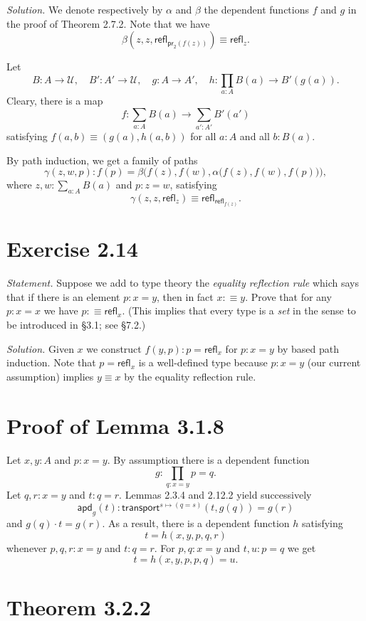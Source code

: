 \documentclass[12pt]{article}
\newcommand{\msf}{\mathsf}
\newcommand{\nn}{\noindent}
\newcommand{\pr}{\mathsf{pr}}
\newcommand{\refl}{\mathsf{refl}}
\newcommand{\U}{\mathcal U}
\begin{document}
\nn\emph{Solution.} We denote respectively by $\alpha$ and $\beta$ the dependent functions $f$ and $g$ in the proof of Theorem 2.7.2. Note that we have 
$$
\beta(z,z,\refl_{\pr_2(f(z))})\equiv\refl_z.
$$

Let 
$$
B:A\to\U,\quad B':A'\to\U,\quad g:A\to A',\quad h:\prod_{a:A}B(a)\to B'(g(a)).
$$ 
Cleary, there is a map 
$$
f:\sum_{a:A}B(a)\to\sum_{a':A'}B'(a')
$$ 
satisfying $f(a,b)\equiv (g(a),h(a,b))$ for all $a:A$ and all $b:B(a)$. 

By path induction, we get a family of paths 
$$
\gamma(z,w,p):f(p)=\beta\Big(f(z),f(w),\alpha\big(f(z),f(w),f(p)\big)\Big),
$$ 
where $z,w:\sum_{a:A}B(a)$ and $p:z=w$, satisfying 
$$
\gamma(z,z,\refl_z)\equiv\refl_{\refl_{f(z)}}.
$$


\section{Exercise 2.14}

\emph{Statement.} Suppose we add to type theory the \emph{equality reflection rule} which says that if there is an element $p:x=y$, then in fact $x:\equiv y$. Prove that for any $p:x=x$ we have $p:\equiv\refl_x$. (This implies that every type is a \emph{set} in the sense to be introduced in \S3.1; see \S7.2.)

\nn\emph{Solution.} Given $x$ we construct $f(y,p):p=\refl_x$ for $p:x=y$ by based path induction. Note that $p=\refl_x$ is a well-defined type because $p:x=y$ (our current assumption) implies $y\equiv x$ by the equality reflection rule.


\section{Proof of Lemma 3.1.8}

Let $x,y:A$ and $p:x=y$. By assumption there is a dependent function 
$$
g:\prod_{q:x=y}p=q.
$$ 
Let $q,r:x=y$ and $t:q=r$. Lemmas 2.3.4 and 2.12.2 yield successively 
$$
\msf{apd}_g(t):\msf{transport}^{s\mapsto(q=s)}(t,g(q))=g(r) 
$$
and $g(q)\cdot t=g(r)$. As a result, there is a dependent function $h$ satisfying $$t=h(x,y,p,q,r)$$ whenever $p,q,r:x=y$ and $t:q=r$. For $p,q:x=y$ and $t,u:p=q$ we get 
$$
t=h(x,y,p,p,q)=u.
$$


\section{Theorem 3.2.2}
\end{document}
